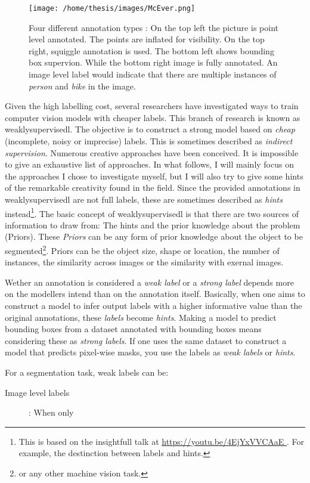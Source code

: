 \begin{SCfigure}[][htb]
    \centering
    \texttt{[image: /home/thesis/images/McEver.png]}
    \caption{Four different annotation types \cite{McEver2020}: 
    On the top left the picture is point level annotated. The points are inflated for visibility.
    On the top right, squiggle annotation is used.
    The bottom left shows bounding box supervion.
    While the bottom right image is fully annotated.
    An image level label would indicate that there are multiple instances of \textit{person} and \textit{bike} in the image.
    \label{fig:ImageLabelTypes}}
\end{SCfigure}

Given the high labelling cost, several researchers have investigated ways to train computer vision models with cheaper labels.
This branch of research is known as \Gls{weaklysupervisedl}.
The objective is to construct a strong model based on \textit{cheap} (incomplete, noisy or imprecise) labels. 
This is sometimes described as \textit{indirect supervision}.
Numerous creative approaches have been conceived. 
It is impossible to give an exhaustive list of approaches. 
In what follows, I will mainly focus on the approaches I chose to investigate myself, but I will also try to give some hints of the remarkable creativity found in the field.
Since the provided annotations in \Gls{weaklysupervisedl} are not full labels, these are sometimes described as \textit{hints} instead\footnote{
    This is based on the insightfull talk at \url{
        https://youtu.be/4EjYxVVCAaE
    }. For example, the destinction between labels and hints.
}.
The basic concept of \Gls{weaklysupervisedl} is that there are two sources of information to draw from: The hints and the prior knowledge about the problem (Priors).
These \textit{Priors} can be any form of prior knowledge about the object to be segmented\footnote{or any other machine vision task.}.
Priors can be the object size, shape or location, the number of instances, the similarity across images or the similarity with exernal images.

Wether an annotation is considered a \textit{weak label} or a \textit{strong label} depends more on the modellers intend than on the annotation itself. 
Basically, when one aims to construct a model to infer output labels with a higher informative value than the original annotations, these \textit{labels} become \textit{hints}.
Making a model to predict bounding boxes from a dataset annotated with bounding boxes means considering these as \textit{strong labels}. 
If one uses the same dataset to construct a model that predicts pixel-wise masks, you use the labels as \textit{weak labels} or \textit{hints}.

For a segmentation task, weak labels can be:
\begin{description}
    \item[Image level labels]: When only  
\end{description}

